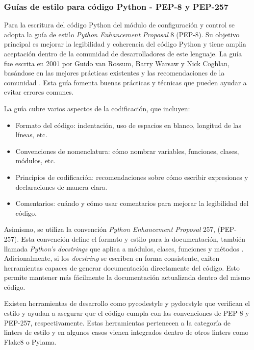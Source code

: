 \subsubsection{Guías de estilo para código Python - PEP-8 y PEP-257}

Para la escritura del código Python del módulo de configuración y control se adopta la guía de estilo \textit{Python Enhancement Proposal} 8 (PEP-8). Su objetivo principal es mejorar la legibilidad y coherencia del código Python y tiene amplia aceptación dentro de la comunidad de desarrolladores de este lenguaje. La guía fue escrita en 2001 por Guido van Rossum, Barry Warsaw y Nick Coghlan, basándose en las mejores prácticas existentes y las recomendaciones de la comunidad \citep{pep8}. Esta guía fomenta buenas prácticas y técnicas que pueden ayudar a evitar errores comunes.

La guía cubre varios aspectos de la codificación, que incluyen:

\begin{itemize}
	\item Formato del código: indentación, uso de espacios en blanco, longitud de las líneas, etc.
	\item Convenciones de nomenclatura: cómo nombrar variables, funciones, clases, módulos, etc.
	\item Principios de codificación: recomendaciones sobre cómo escribir expresiones y declaraciones de manera clara.
	\item Comentarios: cuándo y cómo usar comentarios para mejorar la legibilidad del código.
\end{itemize}

Asimismo, se utiliza la convención \textit{Python Enhancement Proposal} 257, (PEP-257).  Esta convención define el formato y estilo para la documentación, también llamada \textit{Python's docstrings} que aplica a módulos, clases, funciones y métodos \citep{pep257}.  Adicionalmente, si los \textit{docstring} se escriben en forma consistente, exiten herramientas capaces de generar documentación directamente del código.  Esto permite mantener más fácilmente la documentación actualizada dentro del mismo código.

Existen herramientas de desarrollo como pycodestyle y pydocstyle que verifican el estilo y ayudan a asegurar que el código cumpla con las convenciones de PEP-8 y PEP-257, respectivamente.  Estas herramientas pertenecen a la categoría de linters de estilo y en algunos casos vienen integrados dentro de otros linters como Flake8 o Pylama.

